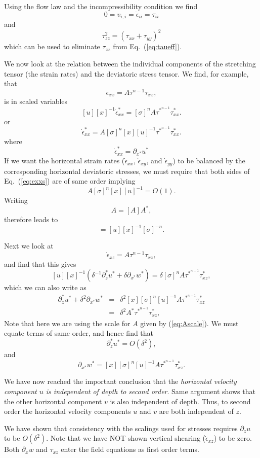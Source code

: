 \documentclass[10pt,a4paper]{book}
\newcommand{\p}{\partial}
\newcommand{\de}{\delta}
\newcommand{\eii}{\dot{\epsilon}_{ii}}
\newcommand{\exx}{\dot{\epsilon}_{xx}}
\newcommand{\eyy}{\dot{\epsilon}_{yy}}
\newcommand{\exz}{\dot{\epsilon}_{xz}}
\newcommand{\exy}{\dot{\epsilon}_{xy}}
\begin{document}
Using the flow law and the incompressibility condition
we find  
\[
0=v_{i,i}=\eii=\tau_{ii}
\]
and 
\[ 
\tau_{zz}^2=(\tau_{xx} +\tau_{yy})^2 
\]
which can be used to eliminate  $\tau_{zz}$ from Eq.~(\ref{eq:taueff}).



We now look at the relation between the individual components of the
stretching tensor (the strain rates) and the deviatoric stress tensor.
We find, for example, that
\[ \exx=A \tau^{n-1} \tau_{xx} ,\]
is in scaled variables
\[ [u] [x]^{-1} \exx^* = [\sigma]^n A \tau^{*^{n-1}} \tau_{xx}^*  .\]
or
\begin{equation}
\exx^* = A [\sigma]^n [x] [u]^{-1} \tau^{*^{n-1}} \tau_{xx}^*  .
\label{eq:exxs}
\end{equation}
where
\[
\exx^* = \p_{x^*} u^*
\]
If we want the horizontal strain rates ($\exx$, $\exy$, and $\eyy$) to be balanced by the
corresponding horizontal deviatoric stresses, we must require that both sides of Eq.~(\ref{eq:exxs})
are of same order implying
\[
 A [\sigma]^n [x] [u]^{-1}=O(1) .
\]
Writing
\[
A= [A] A^* ,
\]
therefore leads to
\begin{equation}
[A]=[u] [x]^{-1} [\sigma]^{-n} .
\label{eq:Ascale}
\end{equation}



Next we look
at
\[ \exz=A \tau^{n-1} \tau_{xz} ,\]
and find that this gives
\[ [u] [x]^{-1} ( \de^{-1} \p_z^* u^* +  \de \p_{x^*} w^* ) = \de [\sigma]^n A \tau^{*^{n-1}} \tau_{xz}^*,\]
which we can also write as
\begin{eqnarray*}
 \p_z^* u^* +  \de^2 \p_{x^*} w^*  &=& \de^2 [x] [\sigma]^n [u]^{-1} A \tau^{*^{n-1}} \tau_{xz}^* \\
&=& \de^2 A^* \tau^{*^{n-1}} \tau_{xz}^* ,
\end{eqnarray*}
Note that here we are using the scale for $A$ given by (\ref{eq:Ascale}).
We must equate terms of same order, and hence  find that
\[ \p_z^* u^* =O(\de^2) ,\]
and 
\[ 
\p_{x^*} w^*  = [x] [\sigma]^n [u]^{-1} A \tau^{*^{n-1}} \tau_{xz}^* .\]




We have now reached the important conclusion that the {\em horizontal
velocity component $u$ is independent of depth to second order}. Same
argument shows that the other horizontal component $v$ is also
independent of depth.  Thus, to second order the horizontal velocity
components $u$ and $v$ are both independent of $z$. 


We have shown that consistency with the scalings used for stresses
requires $\p_z u$  to be $O(\de^2)$. Note that we have
NOT shown vertical shearing ($\exz$) to be zero.  Both $\p_{x} w$ and
$\tau_{xz}$ enter the field equations as first order terms.
\end{document}

